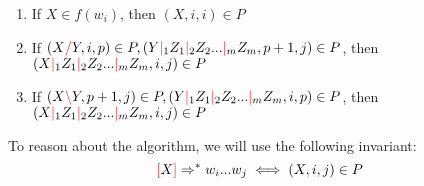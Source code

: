 \documentclass[12pt]{extarticle}
\theoremstyle{definition} \newtheorem{defn}{Definition}
\theoremstyle{definition} \newtheorem{prop}{Proposition}
\newcommand{\lc}{\textcolor{red}{\backslash}}
\newcommand{\rc}{\textcolor{red}{/}}
\newcommand{\mc}{\textcolor{red}{|}}
\newcommand{\lb}{\textcolor{red}{[}}
\newcommand{\rb}{\textcolor{red}{]}}
\begin{document}
\begin{enumerate}
    \item If $X \in f(w_i)$, then $(X, i, i) \in P$
    \item If $(X \rc Y, i, p) \in P, (Y \mc_1 Z_1 \mc_2 Z_2 ... \mc_m Z_m, p + 1, j) \in P$,
        then $(X \mc_1 Z_1 \mc_2 Z_2 ... \mc_m Z_m, i, j) \in P$
    \item If $(X \lc Y, p + 1, j) \in P, (Y \mc_1 Z_1 \mc_2 Z_2 ... \mc_m Z_m, i, p) \in P$,
        then $(X \mc_1 Z_1 \mc_2 Z_2 ... \mc_m Z_m, i, j) \in P$
\end{enumerate}

To reason about the algorithm, we will use the following invariant:
\begin{equation}
    \lb X \rb \Rightarrow^* w_i ... w_j \iff (X, i, j) \in P
\end{equation}
\end{document}
